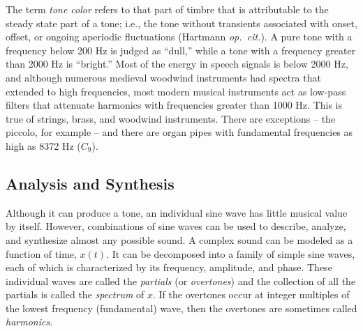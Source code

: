The term \emph{tone color} refers to that part of timbre that is
attributable to the steady state part of a tone; i.e., the tone
without transients associated with onset, offset, or ongoing
aperiodic fluctuations (Hartmann \emph{op.~cit.}).  A pure tone
with a frequency below 200 Hz is judged as ``dull,'' while a tone with
a frequency greater than 2000 Hz is ``bright.''  Most of the energy in
speech signals is below 2000 Hz, and although numerous medieval
woodwind instruments had spectra that extended to high frequencies,
most modern musical instruments act as low-pass filters that attenuate
harmonics with frequencies greater than 1000 Hz.  This is true of
strings, brass, and woodwind instruments.  There are exceptions -- the
piccolo, for example -- and there are organ pipes with fundamental
frequencies as high as 8372 Hz ($C_9$).

{\subsection{Analysis and Synthesis\protect\footnotemark}
}
\label{sec:synthesis}
Although it can produce a tone, an individual sine wave has little
musical value by itself.  However, combinations of sine waves can be
used to describe, analyze, and synthesize almost any possible sound.
A complex sound can be modeled as a function of time, $x(t)$.  It can
be decomposed into a family of simple sine waves, each of which is
characterized by its frequency, amplitude,  and phase.  These
individual waves are called the {\it partials} 
(or {\it overtones}) and the collection of all the partials is called
the {\it spectrum} of $x$.  If the overtones occur at integer
multiples of the lowest frequency (fundamental) wave, then the
overtones are sometimes called {\it harmonics}.


